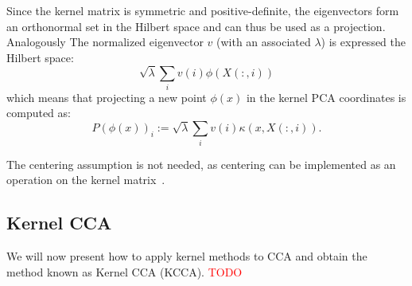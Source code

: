 Since the kernel matrix is symmetric and positive-definite, the eigenvectors form an orthonormal set in the Hilbert space and
can thus be used as a projection. Analogously 
 The normalized eigenvector $v$ (with an associated $\lambda$) is expressed the Hilbert space:
$$ \sqrt{\lambda} \sum_i v(i) \phi(X(:,i))$$
which means that projecting a new point $\phi(x)$ in the kernel PCA coordinates is computed as:
$$P(\phi(x))_i := \sqrt{\lambda} \sum_i v(i) \kappa(x, X(:,i)).$$

The centering assumption is not needed, as centering can be implemented as an operation on the kernel matrix~\cite{shawe-taylor04kernel}.

\subsection{Kernel CCA}

We will now present how to apply kernel methods to CCA and obtain the method known as Kernel CCA (KCCA).
\textcolor{red}{TODO}






